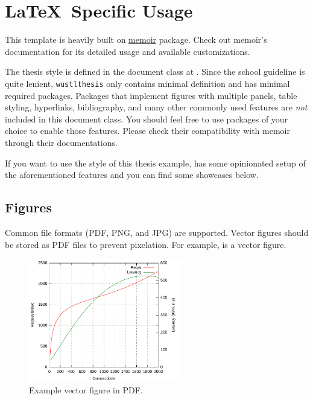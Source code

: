 \chapter{{\LaTeX}\ Specific Usage}

This template is heavily built on \href{https://www.ctan.org/pkg/memoir}{memoir} package.
Check out memoir's documentation for its detailed usage and available customizations.

The thesis style is defined in the document class at .
Since the school guideline is quite lenient, \texttt{wustlthesis} only contains minimal definition and has minimal required packages.
Packages that implement figures with multiple panels, table styling, hyperlinks, bibliography, and many other commonly used features are \emph{not} included in this document class.
You should feel free to use packages of your choice to enable those features.
Please check their compatibility with memoir through their documentations.

If you want to use the style of this thesis example,  has some opinionated setup of the aforementioned features and you can find some showcases below.


\section{Figures}
Common file formats (PDF, PNG, and JPG) are supported.
Vector figures should be stored as PDF files to prevent pixelation.
For example,  is a vector figure.

\begin{figure}[tb]
  \centering
  \includegraphics[width=0.6\textwidth]{figures/just-a-plot}
  \caption{Example vector figure in PDF.}
  \label{fig:vector}
\end{figure}



